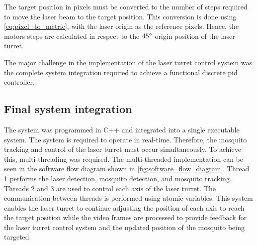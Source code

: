 The target position in pixels must be converted to the number of steps required to move the laser beam to the target position. This conversion is done using \autoref{eq:pixel_to_metric}, with the laser origin as the reference pixels. Hence, the motors steps are calculated in respect to the $45^{\circ}$ origin position of the laser turret.

The major challenge in the implementation of the laser turret control system was the complete system integration required to achieve a functional discrete \gls{pid} controller.

\subsection{Final system integration}\label{subsec:integration}
The system was programmed in C++ and integrated into a single executable system. The system is required to operate in real-time. Therefore, the mosquito tracking and control of the laser turret must occur simultaneously. To achieve this, multi-threading was required. The multi-threaded implementation can be seen in the software flow diagram shown in \autoref{fig:software_flow_diagram}. Thread 1 performs the laser detection, mosquito detection, and mosquito tracking. Threads 2 and 3 are used to control each axis of the laser turret. The communication between threads is performed using atomic variables. This system enables the laser turret to continue adjusting the position of each axis to reach the target position while the video frames are processed to provide feedback for the laser turret control system and the updated position of the mosquito being targeted.
